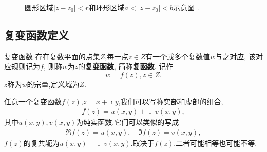\begin{figure}
    \centering

    
    \caption{圆形区域$\left|z-z_0\right|<r$和环形区域$a<\left|z-z_0\right|<b$示意图 .}
    \label{fig:annular}
\end{figure}


\subsection{复变函数定义}
\label{sub:cmplx_func_def}
\begin{definition}{复变函数}
存在复数平面的点集$Z$,每一点$z\in Z$有一个或多个复数值$w$与之对应, 该对应规则记为$f$, 则称$w$为$z$的\textbf{复变函数}, 简称\textbf{复函数}.
记作
\begin{equation}
    w = f(z), z\in Z .
\end{equation}
$z$称为$w$的宗量,定义域为$Z$.
\end{definition}
任意一个复变函数$f(z)$,$z=x + \imath y$,我们可以写称实部和虚部的组合,
\begin{align}
    f(z) = u(x,y) +\imath \; v(x,y) ,
\end{align}
其中$u(x,y), v(x,y)$为纯实函数.它们可以类似的写成
\begin{align}
    \Re f(z) = u(x,y), \quad \Im f(z) = v(x,y) ,
\end{align}
$f(z)$的复共轭为$u(x,y) - \imath \; v(x,y)$.取决于$f(z)$,二者可能相等也可能不等.

